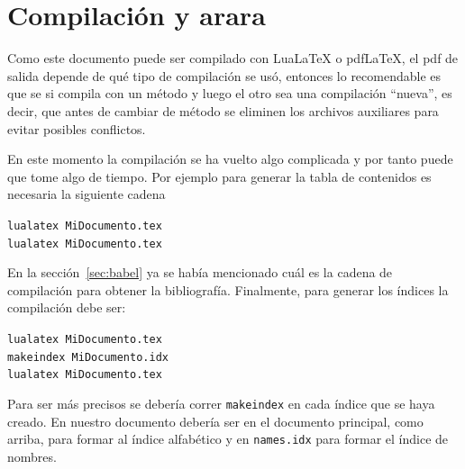 
\chapter{Compilación y arara}
Como este documento puede ser compilado con Lua\LaTeX{} o pdf\LaTeX{}, el
pdf de salida depende de qué tipo de compilación se usó,
entonces lo recomendable es que se si compila con un método y luego el otro
sea una compilación \enquote{nueva}, es decir, que antes de cambiar de
método se eliminen los archivos auxiliares para evitar posibles conflictos.

En este momento la compilación se ha vuelto algo complicada y por tanto puede
que tome algo de tiempo. Por ejemplo para generar la tabla de contenidos es
necesaria la siguiente cadena
\begin{flushleft}
  \verb|lualatex MiDocumento.tex|\\
  \verb|lualatex MiDocumento.tex|
\end{flushleft}

En la sección~\ref{sec:babel} ya se había mencionado cuál es la cadena de
compilación para obtener la bibliografía. Finalmente, para generar los
índices la compilación debe ser:
\begin{flushleft}
  \verb|lualatex MiDocumento.tex|\\
  \verb|makeindex MiDocumento.idx|\\
  \verb|lualatex MiDocumento.tex|
\end{flushleft}

Para ser más precisos se debería correr \texttt{makeindex} en cada índice que
se haya creado. En nuestro documento debería ser en el documento principal,
como arriba, para formar al índice alfabético y en \texttt{names.idx} para
formar el índice de nombres.

